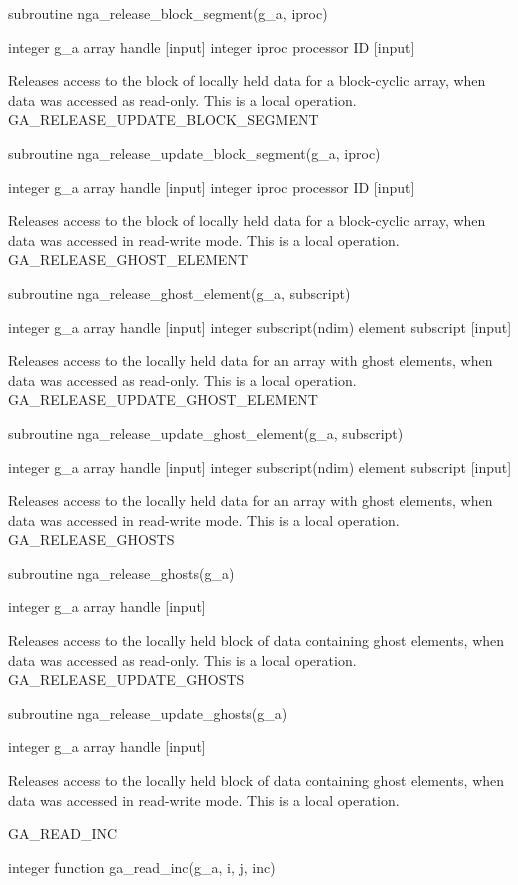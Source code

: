 subroutine nga\_release\_block\_segment(g\_a, iproc)

integer g\_a array handle {[}input{]} integer iproc processor ID {[}input{]}

Releases access to the block of locally held data for a block-cyclic
array, when data was accessed as read-only. This is a local operation.
GA\_RELEASE\_UPDATE\_BLOCK\_SEGMENT

subroutine nga\_release\_update\_block\_segment(g\_a, iproc)

integer g\_a array handle {[}input{]} integer iproc processor ID {[}input{]}

Releases access to the block of locally held data for a block-cyclic
array, when data was accessed in read-write mode. This is a local
operation. GA\_RELEASE\_GHOST\_ELEMENT

subroutine nga\_release\_ghost\_element(g\_a, subscript)

integer g\_a array handle {[}input{]} integer subscript(ndim) element
subscript {[}input{]}

Releases access to the locally held data for an array with ghost elements,
when data was accessed as read-only. This is a local operation. GA\_RELEASE\_UPDATE\_GHOST\_ELEMENT

subroutine nga\_release\_update\_ghost\_element(g\_a, subscript)

integer g\_a array handle {[}input{]} integer subscript(ndim) element
subscript {[}input{]}

Releases access to the locally held data for an array with ghost elements,
when data was accessed in read-write mode. This is a local operation.
GA\_RELEASE\_GHOSTS

subroutine nga\_release\_ghosts(g\_a)

integer g\_a array handle {[}input{]}

Releases access to the locally held block of data containing ghost
elements, when data was accessed as read-only. This is a local operation.
GA\_RELEASE\_UPDATE\_GHOSTS

subroutine nga\_release\_update\_ghosts(g\_a)

integer g\_a array handle {[}input{]}

Releases access to the locally held block of data containing ghost
elements, when data was accessed in read-write mode. This is a local
operation.

GA\_READ\_INC

integer function ga\_read\_inc(g\_a, i, j, inc)

